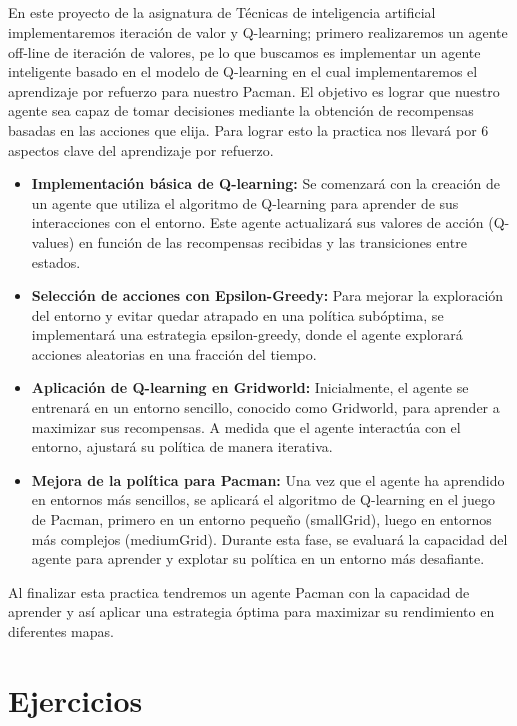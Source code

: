 \documentclass{report}
\begin{document}
    \paragraph*{}{
      En este proyecto de la asignatura de Técnicas de inteligencia artificial implementaremos iteración de valor y Q-learning; primero realizaremos un agente off-line de iteración de valores, pe lo que buscamos es implementar un agente inteligente basado en el modelo de Q-learning en el cual implementaremos el aprendizaje por refuerzo para nuestro Pacman. El objetivo es lograr que nuestro agente sea capaz de tomar decisiones mediante la obtención de recompensas basadas en las acciones que elija. Para lograr esto la practica nos llevará por 6 aspectos clave del aprendizaje por refuerzo.

      \begin{itemize}
        \item \textbf{Implementación básica de Q-learning:} Se comenzará con la creación de un agente que utiliza el algoritmo de Q-learning para aprender de sus interacciones con el entorno. Este agente actualizará sus valores de acción (Q-values) en función de las recompensas recibidas y las transiciones entre estados.
        \item \textbf{Selección de acciones con Epsilon-Greedy:} Para mejorar la exploración del entorno y evitar quedar atrapado en una política subóptima, se implementará una estrategia epsilon-greedy, donde el agente explorará acciones aleatorias en una fracción del tiempo.
        \item \textbf{Aplicación de Q-learning en Gridworld:} Inicialmente, el agente se entrenará en un entorno sencillo, conocido como Gridworld, para aprender a maximizar sus recompensas. A medida que el agente interactúa con el entorno, ajustará su política de manera iterativa.
        \item \textbf{Mejora de la política para Pacman:} Una vez que el agente ha aprendido en entornos más sencillos, se aplicará el algoritmo de Q-learning en el juego de Pacman, primero en un entorno pequeño (smallGrid), luego en entornos más complejos (mediumGrid). Durante esta fase, se evaluará la capacidad del agente para aprender y explotar su política en un entorno más desafiante.
      \end{itemize}

      Al finalizar esta practica tendremos un agente Pacman con la capacidad de aprender y así aplicar una estrategia óptima para maximizar su rendimiento en diferentes mapas.
    }
  \chapter{Ejercicios} %
\end{document}
